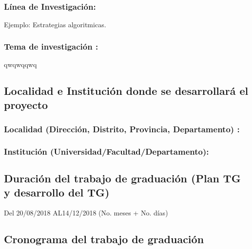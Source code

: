 \documentclass[a4paper, 12pt]{article}
\begin{document}
\subsubsection{Línea de Investigación:} 
Ejemplo: Estrategias algoritmicas.
               
\subsubsection{Tema de investigación :} qwqwqqwq


\subsection{Localidad e Institución donde se desarrollará el proyecto }
  
\subsubsection{Localidad (Dirección, Distrito, Provincia, Departamento) :} 
\subsubsection{Institución (Universidad/Facultad/Departamento):}

  
\subsection{Duración del trabajo de graduación (Plan TG y desarrollo del TG)}
\hspace*{0.7cm}Del \hspace*{0.2cm}20/08/2018 \hspace*{0.3cm} AL\hspace*{0.2cm}14/12/2018  \hspace*{0.2cm}(No. meses +  No. días)
  
    
  
  
\subsection{Cronograma del trabajo de graduación}


\end{document}
